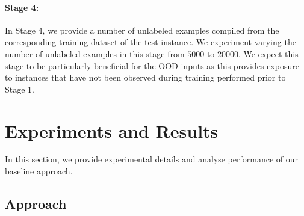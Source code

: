 \documentclass[11pt,a4paper]{article}
\begin{document}
\paragraph{Stage 4:}
In Stage 4, we provide a number of unlabeled examples compiled from the corresponding training dataset of the test instance. 
We experiment varying the number of unlabeled examples in this stage from $5000$ to $20000$.
We expect this stage to be particularly beneficial for the OOD inputs as this provides exposure to instances that have not been observed during training performed prior to Stage 1.

\section{Experiments and Results}
In this section, we provide experimental details and analyse performance of our baseline approach.

\subsection{Approach}

\end{document}
